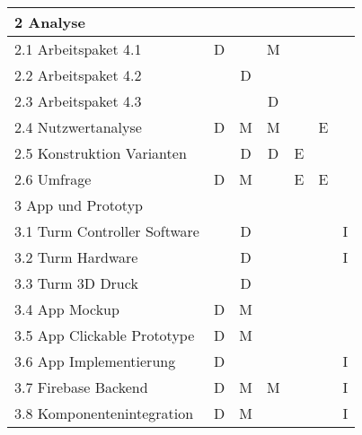 \begin{longtable}{|l|c|c|c|c|c|c|}
    \multicolumn{7}{|l|}{2 Analyse}                                                                                               \\ \hline
    2.1 Arbeitspaket 4.1                   & D              &             & M          &          &               &               \\ \hline
    2.2 Arbeitspaket 4.2                   &                & D           &            &          &               &               \\ \hline
    2.3 Arbeitspaket 4.3                   &                &             & D          &          &               &               \\ \hline
    2.4 Nutzwertanalyse                    & D              & M           & M          &          & E             &               \\ \hline
    2.5 Konstruktion Varianten             &                & D           & D          & E        &               &               \\ \hline
    2.6 Umfrage                            & D              & M           &            & E        & E             &               \\ \hline

    \multicolumn{7}{|l|}{3 App und Prototyp }                                                                                     \\ \hline
    3.1 Turm Controller Software           &                & D           &            &          &               & I             \\ \hline
    3.2 Turm Hardware                      &                & D           &            &          &               & I             \\ \hline
    3.3 Turm 3D Druck                      &                & D           &            &          &               &               \\ \hline
    3.4 App Mockup                         & D              & M           &            &          &               &               \\ \hline
    3.5 App Clickable Prototype            & D              & M           &            &          &               &               \\ \hline
    3.6 App Implementierung                & D              &             &            &          &               & I             \\ \hline
    3.7 Firebase Backend                   & D              & M           & M          &          &               & I             \\ \hline
    3.8 Komponentenintegration             & D              & M           &            &          &               & I             \\ \hline


\end{longtable}
